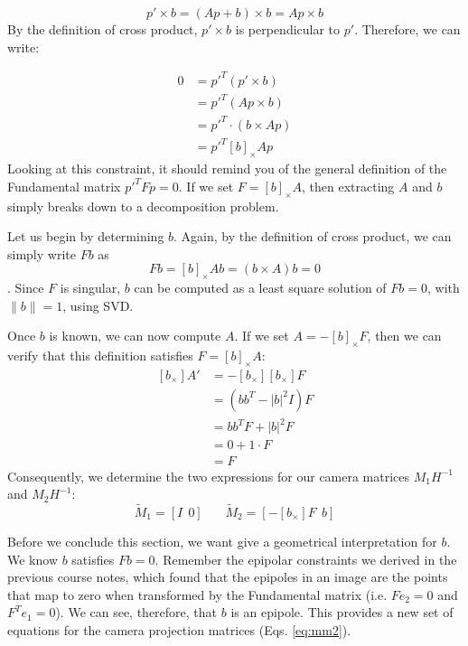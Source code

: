 \documentclass[a4paper, 12pt]{article}
\numberwithin{equation}{section}
\begin{document}
\begin{equation}
    p' \times b = (Ap+b) \times b = Ap \times b 
    \label{eq:xptimesb}
\end{equation}
By the definition of cross product, $p' \times b$ is perpendicular to $p'$. Therefore, we can write:

\begin{equation}
    \begin{split}
        0 &= p'^T  ( p' \times b )  \\
        &= p'^T  (Ap \times b )\\
        &= p'^T \cdot (b \times Ap) \\
        & = p'^T[b]_\times Ap
    \end{split}
    \label{eq:xpdot1}
\end{equation}
Looking at this constraint, it should remind you of the general definition of the Fundamental matrix $p'^T Fp = 0$. If we set $F=[b]_\times A$, then extracting $A$ and $b$ simply breaks down to a decomposition problem. 

Let us begin by determining $b$. Again, by the definition of cross product, we can simply write $Fb$ as 
\begin{equation}
    Fb = [b]_\times A b = (b\times A)b = 0
    \label{eq:cross_b}
\end{equation}.  
Since $F$ is singular, $b$ can be computed as a least square solution of $F b = 0$, with $\|b\|=1$, using SVD. 

Once $b$ is known, we can now compute $A$. If we set $A=-[b]_\times F$, then we can verify that this definition satisfies $F = [b]_\times A$:
\begin{equation}
    \begin{split}
        [b_\times]A' &= -[b_\times][b_\times]F \\
        & =(bb^T - |b|^2I)F \\
        &= bb^TF + |b|^2F \\
        &= 0 + 1\cdot F \\
        &=F
    \end{split}
    \label{eq:bap}
\end{equation}
Consequently, we determine the two expressions for our camera matrices $M_1H^{-1}$ and $M_2H^{-1}$:
\begin{equation}
    \tilde{M}_1 = [I ~~ 0] ~~~~~~~~ \tilde{M}_2 = [- [b_\times]F ~~ b]
    \label{eq:mm}
\end{equation}

Before we conclude this section, we want give a geometrical interpretation for $b$. We know $b$ satisfies $Fb=0$. Remember the epipolar constraints we derived in the previous course notes, which found that the epipoles in an image are the points that map to zero when transformed by the Fundamental matrix (i.e. $Fe_2=0$ and $F^T e_1=0$). We can see, therefore, that $b$ is an epipole. This provides a new set of equations for the camera projection matrices (Eqs. \ref{eq:mm2}). 
\end{document}
